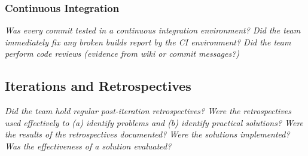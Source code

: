 \documentclass[../dissertation.tex]{subfiles}
\begin{document}
\subsubsection{Continuous Integration}

\textit{Was every commit tested in a continuous integration environment? Did the team immediately fix any broken builds report by the CI environment?  Did the team perform code reviews (evidence from wiki or commit messages?)}

\subsection{Iterations and Retrospectives}

\textit{Did the team hold regular post-iteration retrospectives? Were the retrospectives used effectively to (a) identify problems and (b) identify practical solutions? Were the results of the retrospectives documented? Were the solutions implemented? Was the effectiveness of a solution evaluated?}
\end{document}
